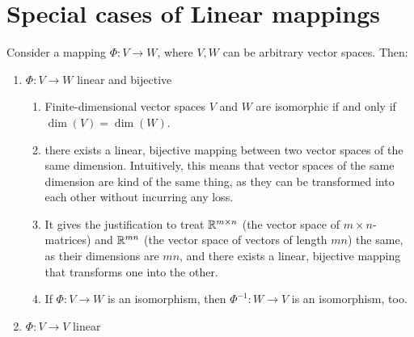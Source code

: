 \section{Special cases of Linear mappings}

Consider a mapping $\Phi : V \to W$, where $V, W$ can be arbitrary vector spaces. 
Then:
\hfill \cite{mfml/book/mml/Deisenroth-Faisal-Ong}

\begin{enumerate}
    \item 
    \begin{definition}[Isomorphism]
        $\Phi : V \to W$ linear and bijective
        \hfill \cite{mfml/book/mml/Deisenroth-Faisal-Ong}
    \end{definition}
    \begin{enumerate}
        \item
        \begin{theorem}
            Finite-dimensional vector spaces $V$ and $W$ are isomorphic if and only if $\dim(V ) = \dim(W)$.
            \hfill \cite{mfml/book/mml/Deisenroth-Faisal-Ong}
        \end{theorem}

        \item there exists a linear, bijective mapping between two vector spaces of the same dimension.
        Intuitively, this means that vector spaces of the same dimension are kind of the same thing, as they can be transformed into each other without incurring any loss.
        \hfill \cite{mfml/book/mml/Deisenroth-Faisal-Ong}

        \item It gives the justification to treat $\mathbb{R}^{m\times n}$ (the vector space of $m \times n$-matrices) and $\mathbb{R}^{mn}$ (the vector space of vectors of length $mn$) the same, as their dimensions are $mn$, and there exists a linear, bijective mapping that transforms one into the other.
        \hfill \cite{mfml/book/mml/Deisenroth-Faisal-Ong}

        \item If $\Phi : V \to W$ is an isomorphism, then $\Phi ^{-1} : W \to V$ is an isomorphism, too.
        \hfill \cite{mfml/book/mml/Deisenroth-Faisal-Ong}
    \end{enumerate}

    \item 
    \begin{definition}[Endomorphism]
        $\Phi : V \to V$ linear
        \hfill \cite{mfml/book/mml/Deisenroth-Faisal-Ong}
    \end{definition}


\end{enumerate}

